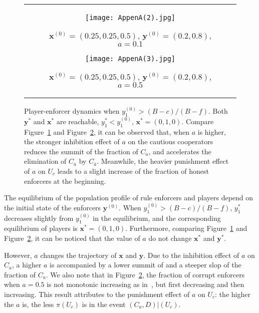 \documentclass[letterpaper,10pt]{article}
\numberwithin{equation}{section}
\begin{document}
\begin{figure}[H]
    \centering
    \begin{tabular}{c}
        \begin{subfigure}[b]{0.5\textwidth}
            \texttt{[image: AppenA(2).jpg]}
            \caption{$ \mathbf{x}^{(0)} = (0.25,0.25,0.5) $, $ \mathbf{y}^{(0)} = (0.2,0.8) $, $ a = 0.1 $}
            \label{AppenA2}
        \end{subfigure}
        \begin{subfigure}[b]{0.5\textwidth}
            \texttt{[image: AppenA(3).jpg]}
            \caption{$ \mathbf{x}^{(0)} = (0.25,0.25,0.5) $, $ \mathbf{y}^{(0)} = (0.2,0.8) $, $ a = 0.5 $}
            \label{AppenA3}
        \end{subfigure}
    \end{tabular}
    \caption{Player-enforcer dynamics when $ y_1^{(0)} > (B-c)/(B-f) $. Both $ \mathbf{y}^* $ and $ \mathbf{x}^*$ are reachable, $ y_{1}^* < y_{1}^{(0)} $, $ \mathbf{x}^* = (0, 1, 0) $. Compare Figure~\ref{AppenA2} and Figure~\ref{AppenA3}, it can be observed that, when $ a $ is higher, the stronger inhibition effect of $ a $ on the cautious cooperators reduces the summit of the fraction of $ C_{a} $, and accelerates the elimination of $ C_{a} $ by $ C_{\bar{a}} $. Meanwhile, the heavier punishment effect of $ a $ on $ U_{c} $ leads to a slight increase of the fraction of honest enforcers at the beginning.}
    \label{AppendBFig1}
\end{figure}

The equilibrium of the population profile of rule enforcers and players depend on the initial state of the enforcers $ \mathbf{y}^{(0)} $. When $ y_{1}^{(0)} > (B-c)/(B-f) $, $ y_{1}^* $ decreases slightly from $ y_{1}^{(0)} $ in the equilibrium, and the corresponding equilibrium of players is $ \mathbf{x}^* = (0,1,0) $. Furthermore, comparing Figure~\ref{AppenA2} and Figure~\ref{AppenA3}, it can be noticed that the value of $ a $ do not change $ \mathbf{x}^* $ and $ \mathbf{y}^* $.

However, $ a $ changes the trajectory of $ \mathbf{x} $ and $ \mathbf{y} $. Due to the inhibition effect of $ a $ on $ C_{a} $, a higher $ a $ is accompanied by a lower summit of and a steeper slop of the fraction of $ C_{a} $. We also note that in Figure~\ref{AppenA3}, the fraction of corrupt enforcers when $ a=0.5 $ is not monotonic increasing as in~, but first decreasing and then increasing. This result attributes to the punishment effect of $ a $ on $ U_{c} $: the higher the $ a $ is, the less $ \pi(U_{c}) $ is in the event $ (C_{a}, D)|(U_{c}) $.
\end{document}
